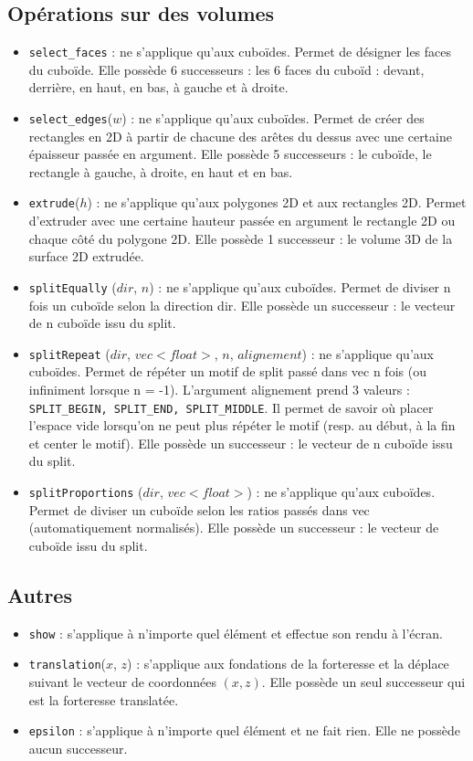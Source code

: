 \documentclass[a4paper,11pt]{article}
\begin{document}
\subsection{Opérations sur des volumes}
\begin{itemize}
    \item \texttt{select\_faces} : ne s'applique qu'aux cuboïdes. Permet de désigner les faces du cuboïde. Elle possède 6 successeurs : les 6 faces du cuboïd : devant, derrière, en haut, en bas, à gauche et à droite.
    \item \texttt{select\_edges}($ w $) : ne s'applique qu'aux cuboïdes. Permet de créer des rectangles en 2D à partir de chacune des arêtes du dessus avec une certaine épaisseur passée en argument. Elle possède 5 successeurs : le cuboïde, le rectangle à gauche, à droite, en haut et en bas.
    \item \texttt{extrude}($ h $) : ne s'applique qu'aux polygones 2D et aux rectangles 2D. Permet d'extruder avec une certaine hauteur passée en argument le rectangle 2D ou chaque côté du polygone 2D. Elle possède 1 successeur : le volume 3D de la surface 2D extrudée.
    \item \texttt{splitEqually} ($ dir $, $ n $) : ne s'applique qu'aux cuboïdes. Permet de diviser n fois un cuboïde selon la direction dir. Elle possède un successeur : le vecteur de n cuboïde issu du split.
    \item \texttt{splitRepeat} ($ dir $, $ vec<float> $, $ n $, $ alignement $) : ne s'applique qu'aux cuboïdes. Permet de répéter un motif de split passé dans vec n fois (ou infiniment lorsque n = -1). L'argument alignement prend 3 valeurs : \texttt{SPLIT\_BEGIN, SPLIT\_END, SPLIT\_MIDDLE}. Il permet de savoir où placer l'espace vide lorsqu'on ne peut plus répéter le motif (resp. au début, à la fin et center le motif). Elle possède un successeur : le vecteur de n cuboïde issu du split.
    \item \texttt{splitProportions} ($ dir $, $ vec<float> $) : ne s'applique qu'aux cuboïdes. Permet de diviser un cuboïde selon les ratios passés dans vec (automatiquement normalisés). Elle possède un successeur : le vecteur de cuboïde issu du split.
\end{itemize}

\subsection{Autres}
\begin{itemize}
    \item \texttt{show} : s'applique à n'importe quel élément et effectue son rendu à l'écran.
    \item \texttt{translation}($ x $, $ z $) : s'applique aux fondations de la forteresse et la déplace suivant le vecteur de coordonnées $(x, z)$. Elle possède un seul successeur qui est la forteresse translatée.
    \item \texttt{epsilon} : s'applique à n'importe quel élément et ne fait rien. Elle ne possède aucun successeur.
\end{itemize}
\end{document}
